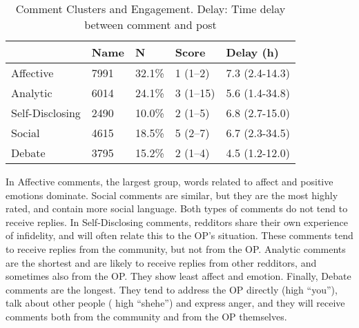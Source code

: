 

\begin{table}
\caption{Comment Clusters and Engagement. Delay: Time delay between comment and post }
\small
\label{tab:commentclust}
\begin{tabular}{lll|ll}
\hline
  &  Name & N  &  Score & Delay (h) \\
  \hline
Affective & 7991 & 32.1\% & 1 (1--2) & 7.3 (2.4-14.3) \\
Analytic & 6014 & 24.1\% & 3 (1--15) & 5.6 (1.4-34.8)\\
Self-Disclosing &2490 & 10.0\% & 2 (1--5) & 6.8 (2.7-15.0) \\
Social & 4615 & 18.5\% & 5 (2--7) & 6.7  (2.3-34.5)\\
Debate & 3795 & 15.2\% & 2 (1--4)   & 4.5 (1.2-12.0) \\
\hline
\end{tabular}
\end{table}

In Affective comments, the largest group, words related to affect and positive emotions dominate. Social comments are similar, but they are the most highly rated, and contain more social language. Both types of comments do not tend to receive replies. In  Self-Disclosing comments, redditors share their own experience of infidelity, and will often relate this to the OP's situation. These comments tend to receive replies from the community, but not from the OP. Analytic comments are the shortest and are likely to receive replies from other redditors, and sometimes also from the OP. They show least affect and emotion. Finally, Debate comments are the longest. They tend  to address the OP directly (high ``you''), talk about other people ( high ``shehe'') and express anger, and they will receive comments both from the community and from the OP themselves. 

